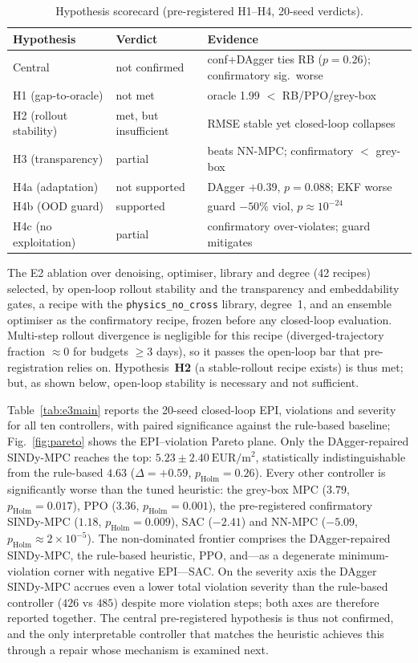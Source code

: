 \documentclass[preprint,3p]{elsarticle}
\begin{document}
\begin{table}[t]
\centering
\caption{Hypothesis scorecard (pre-registered H1--H4, 20-seed verdicts).}
\label{tab:scorecard}
\small
\begin{tabular}{@{}p{2.0cm}p{2.0cm}p{3.2cm}@{}}
\toprule
Hypothesis & Verdict & Evidence \\
\midrule
Central & not confirmed & conf+DAgger ties RB ($p{=}0.26$); confirmatory sig.\ worse \\
H1 (gap-to-oracle) & not met & oracle 1.99 $<$ RB/PPO/grey-box \\
H2 (rollout stability) & met, but insufficient & RMSE stable yet closed-loop collapses \\
H3 (transparency) & partial & beats NN-MPC; confirmatory $<$ grey-box \\
H4a (adaptation) & not supported & DAgger $+0.39$, $p{=}0.088$; EKF worse \\
H4b (OOD guard) & supported & guard $-50\%$ viol, $p{\approx}10^{-24}$ \\
H4c (no exploitation) & partial & confirmatory over-violates; guard mitigates \\
\bottomrule
\end{tabular}
\end{table}

The E2 ablation over denoising, optimiser, library and degree (42 recipes) selected,
by open-loop rollout stability and the transparency and embeddability gates, a recipe
with the \texttt{physics\_no\_cross} library, degree~1, and an ensemble optimiser as
the confirmatory recipe, frozen before any closed-loop evaluation. Multi-step rollout
divergence is negligible for this recipe (diverged-trajectory fraction $\approx 0$ for
budgets $\ge 3$ days), so it passes the open-loop bar that pre-registration relies on.
Hypothesis~\textbf{H2} (a stable-rollout recipe exists) is thus met; but, as shown
below, open-loop stability is necessary and not sufficient.

Table~\ref{tab:e3main} reports the 20-seed closed-loop EPI, violations and severity
for all ten controllers, with paired significance against the rule-based baseline;
Fig.~\ref{fig:pareto} shows the EPI--violation Pareto plane. Only the DAgger-repaired
SINDy-MPC reaches the top: $5.23\pm2.40~\mathrm{EUR/m^2}$, statistically
indistinguishable from the rule-based $4.63$ ($\Delta=+0.59$, $p_{\mathrm{Holm}}=0.26$).
Every other controller is significantly worse than the tuned heuristic: the grey-box
MPC ($3.79$, $p_{\mathrm{Holm}}=0.017$), PPO ($3.36$, $p_{\mathrm{Holm}}=0.001$), the
pre-registered confirmatory SINDy-MPC ($1.18$, $p_{\mathrm{Holm}}=0.009$), SAC
($-2.41$) and NN-MPC ($-5.09$, $p_{\mathrm{Holm}}\approx2\times10^{-5}$). The
non-dominated frontier comprises the DAgger-repaired SINDy-MPC, the rule-based
heuristic, PPO, and---as a degenerate minimum-violation corner with negative EPI---SAC.
On the severity axis the DAgger SINDy-MPC accrues even a lower total violation severity
than the rule-based controller ($426$ vs $485$) despite more violation steps; both axes
are therefore reported together. The central pre-registered hypothesis is thus not
confirmed, and the only interpretable controller that matches the heuristic achieves
this through a repair whose mechanism is examined next.
\end{document}
